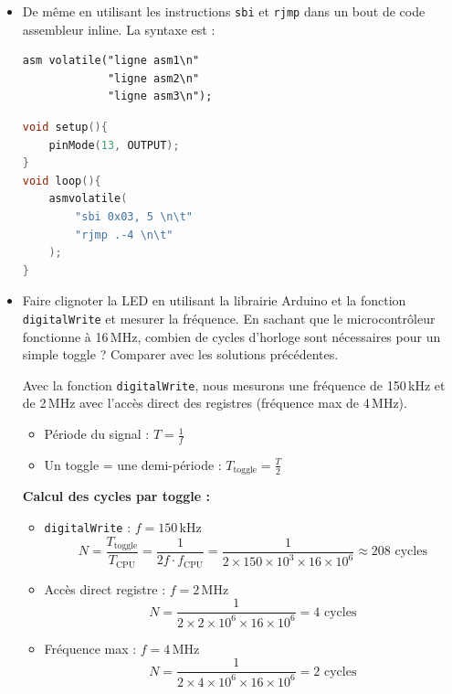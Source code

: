 \documentclass[a4paper,11pt]{article}
\begin{document}
\begin{itemize}
    \item De même en utilisant les instructions \texttt{sbi} et \texttt{rjmp} dans un bout de code assembleur inline. La syntaxe est :
    \begin{verbatim}
asm volatile("ligne asm1\n"
             "ligne asm2\n"
             "ligne asm3\n");
    \end{verbatim}
    \begin{solution}
        \begin{lstlisting}[language=C++]
void setup(){
    pinMode(13, OUTPUT);
}
void loop(){
    asmvolatile(
        "sbi 0x03, 5 \n\t"
        "rjmp .-4 \n\t"
    );
}
        \end{lstlisting}
    \end{solution}

    \item Faire clignoter la LED en utilisant la librairie Arduino et la fonction \texttt{digitalWrite} et mesurer la fréquence. En sachant que le microcontrôleur fonctionne à 16\,MHz, combien de cycles d'horloge sont nécessaires pour un simple toggle ? Comparer avec les solutions précédentes.
    \begin{solution}
    Avec la fonction \texttt{digitalWrite}, nous mesurons une fréquence de 150\,kHz et de 2\,MHz avec l'accès direct des registres (fréquence max de 4\,MHz).

    \begin{itemize}
        \item Période du signal : \( T = \frac{1}{f} \)
        \item Un toggle = une demi-période : \( T_{\text{toggle}} = \frac{T}{2} \)
    \end{itemize}

    \medskip
    \textbf{Calcul des cycles par toggle :}

    \begin{itemize}
        \item \texttt{digitalWrite} : \( f = 150\,\text{kHz} \)
        \[
        N = \frac{T_{\text{toggle}}}{T_{\text{CPU}}}
        = \frac{1}{2 f \cdot f_{\text{CPU}}}
        = \frac{1}{2 \times 150\times10^{3} \times 16\times10^{6}}
        \approx \boxed{208 \text{ cycles}}
        \]

        \item Accès direct registre : \( f = 2\,\text{MHz} \)
        \[
        N = \frac{1}{2 \times 2\times10^{6} \times 16\times10^{6}}
        = \boxed{4 \text{ cycles}}
        \]

        \item Fréquence max : \( f = 4\,\text{MHz} \)
        \[
        N = \frac{1}{2 \times 4\times10^{6} \times 16\times10^{6}}
        = \boxed{2 \text{ cycles}}
        \]
    \end{itemize}


\end{solution}
\end{itemize}
\end{document}
